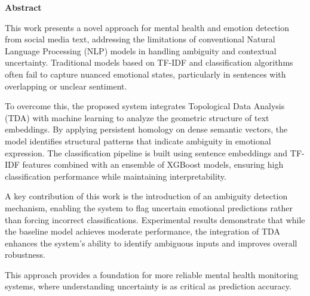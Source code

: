 \begin{flushleft}
    {\Huge\bfseries Abstract}
\end{flushleft}

\vspace{1.5cm}

This work presents a novel approach for mental health and emotion detection from social media
text, addressing the limitations of conventional Natural Language Processing (NLP) models in
handling ambiguity and contextual uncertainty. Traditional models based on TF-IDF and
classification algorithms often fail to capture nuanced emotional states, particularly in
sentences with overlapping or unclear sentiment.

To overcome this, the proposed system integrates Topological Data Analysis (TDA) with machine learning to analyze the geometric structure of text embeddings. By applying persistent homology on dense semantic vectors, the model identifies structural patterns that indicate ambiguity in emotional expression. The classification pipeline is built using sentence embeddings and TF-IDF features combined with an ensemble of XGBoost models, ensuring high classification performance while maintaining interpretability.

A key contribution of this work is the introduction of an ambiguity detection mechanism,
enabling the system to flag uncertain emotional predictions rather than forcing incorrect
classifications. Experimental results demonstrate that while the baseline model achieves
moderate performance, the integration of TDA enhances the system's ability to identify
ambiguous inputs and improves overall robustness.

This approach provides a foundation for more reliable mental health monitoring systems, where
understanding uncertainty is as critical as prediction accuracy.
